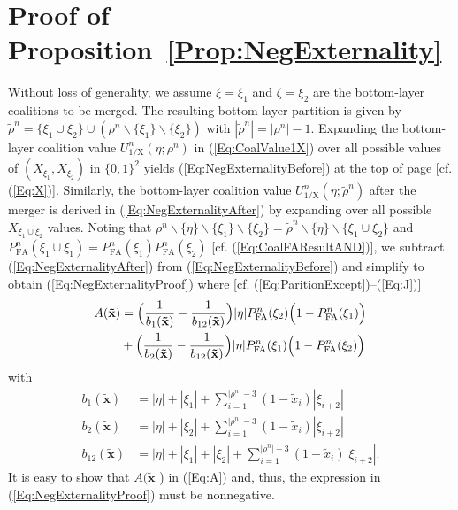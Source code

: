 \documentclass[journal,draftclsnofoot,onecolumn]{IEEEtran}
\theoremstyle{definition}
\begin{document}
\section{Proof of Proposition~\ref{Prop:NegExternality}}\label{Sec:NegExternalityProof}
Without loss of generality, we assume $\xi=\xi _1$ and $\zeta=\xi _2$ are the bottom-layer coalitions to be merged. The resulting bottom-layer partition is given by $\tilde\rho^n = \{ \xi _1  \cup \xi _2 \}  \cup (\rho^n \backslash \{ \xi _1 \} \backslash \{ \xi _2 \} )$ with $|\tilde\rho^n | = |\rho^n | - 1$. Expanding the bottom-layer coalition value ${U_\mathrm{1/X}^n(\eta ;\rho^n )}$ in (\ref{Eq:CoalValue1X}) over all possible values of $(X_{\xi_1},X_{\xi_2})$ in $\{0,1\}^2$ yields (\ref{Eq:NegExternalityBefore}) at the top of page \pageref{Eq:NegExternalityBefore} [cf. (\ref{Eq:X})]. Similarly, the bottom-layer coalition value ${U_\mathrm{1/X}^n(\eta ;\tilde\rho^n )}$ after the merger is derived in (\ref{Eq:NegExternalityAfter}) by expanding over all possible $X_{\xi_1\cup\xi_2}$ values. Noting that $\rho^n\backslash\{\eta\}\backslash\{\xi_1\}\backslash\{\xi_2\}=\tilde\rho^n\backslash\{\eta\}\backslash\{\xi_1\cup\xi_2\}$ and $P_{{\mathrm{FA}}}^n({\xi _1}\cup{\xi _1})=P_{{\mathrm{FA}}}^n({\xi _1})P_{{\mathrm{FA}}}^n({\xi _2})$ [cf. (\ref{Eq:CoalFAResultAND})], we subtract (\ref{Eq:NegExternalityAfter}) from (\ref{Eq:NegExternalityBefore}) and simplify to obtain (\ref{Eq:NegExternalityProof}) where [cf. (\ref{Eq:ParitionExcept})--(\ref{Eq:J})]
\begin{align}\label{Eq:A}
A(\mathbf{\tilde x})& =\Big(\frac{1}{b_1(\mathbf{\tilde x})}-\frac{1}{b_{12}(\mathbf{\tilde x})} \Big)|\eta|P_{{\mathrm{FA}}}^n({\xi _2})\Big(1 -P_{{\mathrm{FA}}}^n({\xi _1})\Big)\\
{}&+ \Big(\frac{1}{b_2(\mathbf{\tilde x})}- \frac{1}{b_{12}(\mathbf{\tilde x})} \Big)|\eta|P_{{\mathrm{FA}}}^n({\xi _1})\Big(1 - P_{{\mathrm{FA}}}^n({\xi _2})\Big)\notag
\end{align}
with
\begin{equation}
\begin{split}
{b_1}(\mathbf{\tilde x}) &= |\eta | + |{\xi _1}| + \sum\nolimits_{i = 1}^{|\rho^n | - 3} {(1 - {\tilde x}_i)|{\xi _{i {+} 2}}|} \\
{b_2}(\mathbf{\tilde x}) &= |\eta | + |{\xi _2}| + \sum\nolimits_{i = 1}^{|\rho^n | - 3} {(1 - {\tilde x}_i)|{\xi _{i {+} 2}}|} \\
{b_{12}}(\mathbf{\tilde x}) &= |\eta | + |{\xi _1}| + |{\xi _2}| + \sum\nolimits_{i = 1}^{|\rho^n | - 3} {(1- {\tilde x}_i)|{\xi _{i {+} 2}}|}.
\end{split}
\end{equation}
It is easy to show that $A(\mathbf{\tilde x}$ ) in (\ref{Eq:A}) and, thus, the expression in (\ref{Eq:NegExternalityProof}) must be nonnegative.




\end{document}
